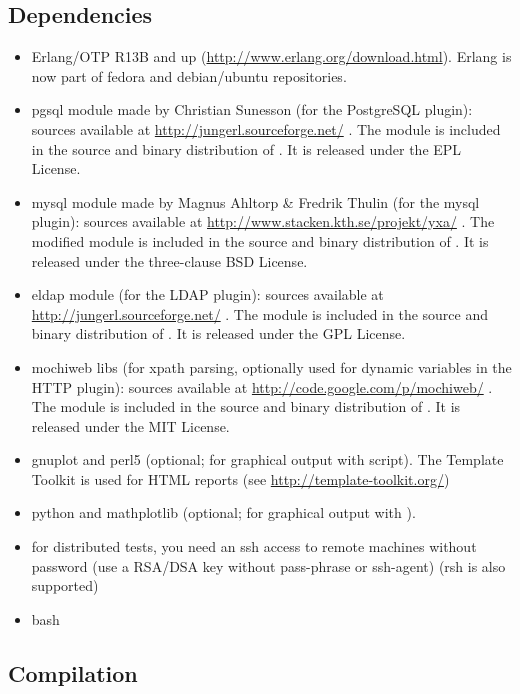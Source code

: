 \documentclass{TSUNG-en}
\begin{document}
\subsection{Dependencies}
\begin{itemize}
\item Erlang/OTP R13B and up
  (\url{http://www.erlang.org/download.html}). Erlang is now
  part of fedora and debian/ubuntu repositories.
  \item pgsql module made by Christian Sunesson (for the PostgreSQL plugin):
    sources available at
    \url{http://jungerl.sourceforge.net/} . The module is
    included in the source and binary distribution of . It
    is released under the EPL License.
  \item mysql module made by Magnus Ahltorp \& Fredrik Thulin  (for the mysql plugin):
    sources available at
    \url{http://www.stacken.kth.se/projekt/yxa/} . The modified module is
    included in the source and binary distribution of . It
    is released under the three-clause BSD License.
  \item eldap module  (for the LDAP plugin):
    sources available at
    \url{http://jungerl.sourceforge.net/} . The module is
    included in the source and binary distribution of . It
    is released under the GPL License.
  \item mochiweb libs (for xpath parsing, optionally used for dynamic variables in
    the HTTP plugin):
    sources available at
    \url{http://code.google.com/p/mochiweb/} . The module is
    included in the source and binary distribution of . It
    is released under the MIT License.
   \item  gnuplot and perl5 (optional; for graphical output with
     script).  The Template Toolkit is used for HTML
    reports (see \url{http://template-toolkit.org/})
   \item  python and mathplotlib (optional; for graphical output with
    ).
  \item for distributed tests, you need an ssh access to remote
    machines without password (use a RSA/DSA key without pass-phrase or
    ssh-agent) (rsh is also supported)
\item bash
\end{itemize}
\subsection{Compilation}
\end{document}
